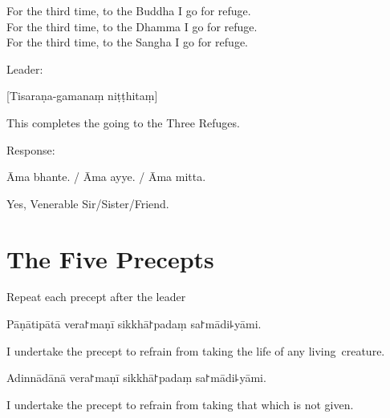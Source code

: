 \begin{english}
  For the third time, to the Buddha I go for refuge.\\
  For the third time, to the Dhamma I go for refuge.\\
  For the third time, to the Sangha I go for refuge.
\end{english}

\begin{instruction}
  Leader:
\end{instruction}

[Tisaraṇa-gamanaṃ niṭṭhitaṃ]

\begin{english}
  This completes the going to the Three Refuges.
\end{english}

\begin{instruction}
  Response:
\end{instruction}

Āma bhante. / Āma ayye. / Āma mitta.

\begin{english}
  Yes, Venerable Sir/Sister/Friend.
\end{english}

\chapter{The Five Precepts}%

\begin{instruction}
  Repeat each precept after the leader
\end{instruction}

\begin{precept}
  \setcounter{enumi}{0}
  \item Pāṇātipātā vera꜓maṇī sikkhā꜓padaṃ sa꜓mādi꜕yāmi.
\end{precept}

\begin{english}
  I undertake the precept to refrain from taking the life of any living~creature.
\end{english}

\begin{precept}
  \setcounter{enumi}{1}
  \item Adinnādānā vera꜓maṇī sikkhā꜓padaṃ sa꜓mādi꜕yāmi.
\end{precept}

\begin{english}
  I undertake the precept to refrain from taking that which is not given.
\end{english}

